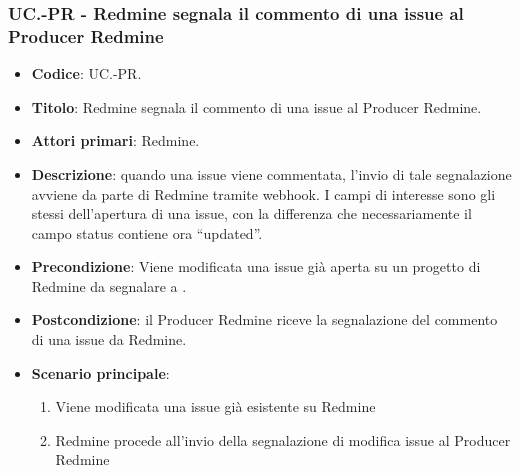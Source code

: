 \subsubsection{UC\theuccount.\thesubuccount-PR - Redmine segnala il commento di una issue al Producer Redmine}
\begin{itemize}
	\item \textbf{Codice}: UC\theuccount.\thesubuccount-PR.
	\item \textbf{Titolo}: Redmine segnala il commento di una issue al Producer Redmine.
	\item \textbf{Attori primari}: Redmine.
	\item \textbf{Descrizione}: quando una issue viene commentata, l'invio di tale segnalazione
	avviene da parte di Redmine tramite webhook.
	I campi di interesse sono gli stessi dell'apertura di una issue, con la differenza che necessariamente il campo status contiene ora ``updated''.
	\item \textbf{Precondizione}: Viene modificata una issue già aperta su un
	progetto di Redmine da segnalare a \progetto.
	\item \textbf{Postcondizione}: il Producer Redmine riceve la segnalazione del commento di una issue da Redmine.
	\item \textbf{Scenario principale}:
	\begin{enumerate}
		\item Viene modificata una issue già esistente su Redmine
		\item Redmine procede all'invio della segnalazione di modifica issue al Producer Redmine
	\end{enumerate}

\end{itemize}
